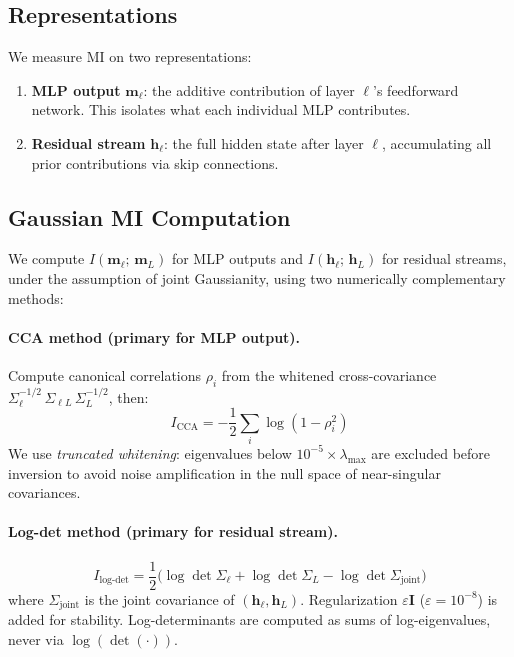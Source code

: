 \documentclass[11pt]{article}
\begin{document}
\subsection{Representations}

We measure MI on two representations:
\begin{enumerate}
    \item \textbf{MLP output} $\mathbf{m}_\ell$: the additive contribution of layer $\ell$'s feedforward network. This isolates what each individual MLP contributes.
    \item \textbf{Residual stream} $\mathbf{h}_\ell$: the full hidden state after layer $\ell$, accumulating all prior contributions via skip connections.
\end{enumerate}

\subsection{Gaussian MI Computation}

We compute $I(\mathbf{m}_\ell;\, \mathbf{m}_L)$ for MLP outputs and $I(\mathbf{h}_\ell;\, \mathbf{h}_L)$ for residual streams, under the assumption of joint Gaussianity, using two numerically complementary methods:

\paragraph{CCA method (primary for MLP output).}
Compute canonical correlations $\rho_i$ from the whitened cross-covariance $\Sigma_\ell^{-1/2}\,\Sigma_{\ell L}\,\Sigma_L^{-1/2}$, then:
\begin{equation}
    I_{\mathrm{CCA}} = -\frac{1}{2}\sum_{i} \log(1 - \rho_i^2)
\end{equation}
We use \emph{truncated whitening}: eigenvalues below $10^{-5}\times\lambda_{\max}$ are excluded before inversion to avoid noise amplification in the null space of near-singular covariances.

\paragraph{Log-det method (primary for residual stream).}
\begin{equation}
    I_{\mathrm{log\text{-}det}} = \frac{1}{2}\bigl(\log\det\Sigma_\ell + \log\det\Sigma_L - \log\det\Sigma_{\mathrm{joint}}\bigr)
\end{equation}
where $\Sigma_{\mathrm{joint}}$ is the joint covariance of $(\mathbf{h}_\ell, \mathbf{h}_L)$. Regularization $\varepsilon \mathbf{I}$ ($\varepsilon = 10^{-8}$) is added for stability. Log-determinants are computed as sums of log-eigenvalues, never via $\log(\det(\cdot))$.
\end{document}
